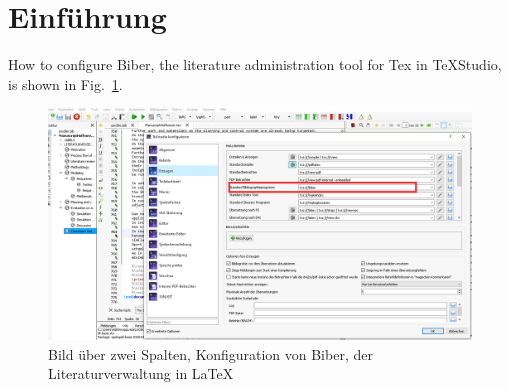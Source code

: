 \section{Einführung}
How to configure Biber, the literature administration tool for Tex in TeXStudio, is shown in Fig.~\ref{fig:texStudio}.

\begin{figure}[tb!]
	\includegraphics[width=\textwidth]{figures/texStudioConfigBiber}
	\caption{Bild über zwei Spalten, Konfiguration von Biber, der Literaturverwaltung in \LaTeX}
	\label{fig:texStudio}
\end{figure}

\lipsum[1]
